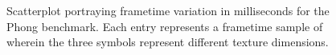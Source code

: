 
\begin{figure}
	\centering
	

    \caption[Phong benchmark frametime volatility]{Scatterplot portraying frametime variation in milliseconds for the Phong benchmark. Each entry represents a frametime sample of wherein the three symbols represent different texture dimensions.}
    \label{fig:scattersphong}
\end{figure}